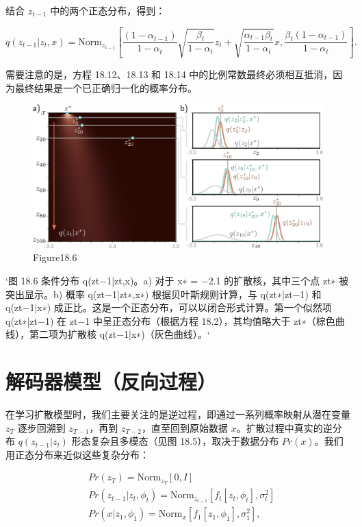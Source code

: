 结合 \(z_{t-1}\) 中的两个正态分布，得到：

\[
q(z_{t-1}|z_t, x) = \text{Norm}_{z_{t-1}} \left[
\frac{(1 - \alpha_{t-1})}{1 - \alpha_t} \sqrt{\frac{\beta_t}{1 - \alpha_t}} z_t + \sqrt{\frac{\alpha_{t-1}\beta_t}{1 - \alpha_t}} x, 
\frac{\beta_t (1 - \alpha_{t-1})}{1 - \alpha_t} 
\right]. \tag{18.15}
\]

需要注意的是，方程 18.12、18.13 和 18.14 中的比例常数最终必须相互抵消，因为最终结果是一个已正确归一化的概率分布。

\begin{figure}[h!]
\centering
\includegraphics[width=0.7\linewidth]{png/chapter18/DiffusionReverseConditional.png}
\caption{Figure18.6}
\end{figure}

`图 18.6 条件分布 q(zt−1|zt,x)。a) 对于 x∗ = −2.1 的扩散核，其中三个点 zt∗ 被突出显示。b) 概率 q(zt−1|zt∗,x∗) 根据贝叶斯规则计算，与 q(zt∗|zt−1) 和 q(zt−1|x∗) 成正比。这是一个正态分布，可以以闭合形式计算。第一个似然项 q(zt∗|zt−1) 在 zt−1 中呈正态分布（根据方程 18.2），其均值略大于 zt∗（棕色曲线），第二项为扩散核 q(zt−1|x∗)（灰色曲线）。`

\section{解码器模型（反向过程）}
在学习扩散模型时，我们主要关注的是逆过程，即通过一系列概率映射从潜在变量 \(z_T\) 逐步回溯到 \(z_{T-1}\)，再到 \(z_{T-2}\)，直至回到原始数据 \(x\)。扩散过程中真实的逆分布 \(q(z_{t-1}|z_t)\) 形态复杂且多模态（见图 18.5），取决于数据分布 \(Pr(x)\)。我们用正态分布来近似这些复杂分布：


\begin{align}
&Pr(z_T) = \text{Norm}_{z_T}[0, I] \\
&Pr(z_{t-1}|z_t, \phi_t) = \text{Norm}_{z_{t-1}}[f_t[z_t, \phi_t], \sigma_t^2] \\
&Pr(x|z_1, \phi_1) = \text{Norm}_{x}[f_1[z_1, \phi_1], \sigma_1^2],
\end{align} 



